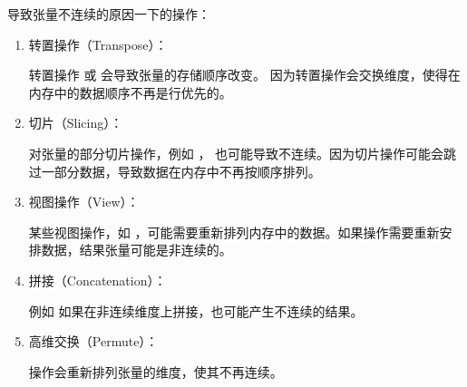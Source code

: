导致张量不连续的原因一下的操作：
\begin{enumerate}[label=\arabic*)]
    \item 转置操作（Transpose）：

    转置操作  或  
    会导致张量的存储顺序改变。
    因为转置操作会交换维度，使得在内存中的数据顺序不再是行优先的。

    \item 切片（Slicing）：
    
    对张量的部分切片操作，例如 ，
    也可能导致不连续。因为切片操作可能会跳过一部分数据，导致数据在内存中不再按顺序排列。
    
    \item 视图操作（View）：
    
    某些视图操作，如 ，可能需要重新排列内存中的数据。如果操作需要重新安排数据，结果张量可能是非连续的。
    
    \item 拼接（Concatenation）：
    
    例如  如果在非连续维度上拼接，也可能产生不连续的结果。
    
    \item 高维交换（Permute）：
    
     操作会重新排列张量的维度，使其不再连续。
\end{enumerate}
